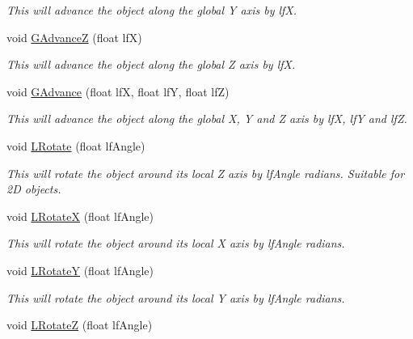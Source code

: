 \begin{DoxyCompactItemize}
\begin{DoxyCompactList}\small\item\em This will advance the object along the global Y axis by lfX. \item\end{DoxyCompactList}\item 
void \hyperlink{classc_matrix4_a0fd4e894762e73050e8e2e38acdfaf0d}{GAdvanceZ} (float lfX)
\begin{DoxyCompactList}\small\item\em This will advance the object along the global Z axis by lfX. \item\end{DoxyCompactList}\item 
void \hyperlink{classc_matrix4_ac1c16ceb7ac4c2f771fc0d4662df643c}{GAdvance} (float lfX, float lfY, float lfZ)
\begin{DoxyCompactList}\small\item\em This will advance the object along the global X, Y and Z axis by lfX, lfY and lfZ. \item\end{DoxyCompactList}\item 
void \hyperlink{classc_matrix4_a90faa594754991420b1fda110f4b144f}{LRotate} (float lfAngle)
\begin{DoxyCompactList}\small\item\em This will rotate the object around its local Z axis by lfAngle radians. Suitable for 2D objects. \item\end{DoxyCompactList}\item 
void \hyperlink{classc_matrix4_ac02520811181e0593e77e55753602c47}{LRotateX} (float lfAngle)
\begin{DoxyCompactList}\small\item\em This will rotate the object around its local X axis by lfAngle radians. \item\end{DoxyCompactList}\item 
void \hyperlink{classc_matrix4_af13f02ca53d8689f8a23df333bde6f15}{LRotateY} (float lfAngle)
\begin{DoxyCompactList}\small\item\em This will rotate the object around its local Y axis by lfAngle radians. \item\end{DoxyCompactList}\item 
void \hyperlink{classc_matrix4_a203f986c0ab6d0abaf4dda01b88f0558}{LRotateZ} (float lfAngle)

\end{DoxyCompactItemize}
